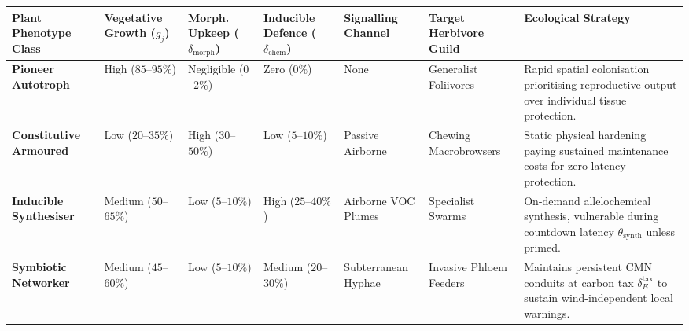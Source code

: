 
\footnotesize
\renewcommand{\arraystretch}{1.15}
\begin{tabularx}{\textwidth}{
  >{\raggedright\arraybackslash\hsize=0.85\hsize}X
  >{\centering\arraybackslash\hsize=0.70\hsize}X
  >{\centering\arraybackslash\hsize=0.68\hsize}X
  >{\centering\arraybackslash\hsize=0.68\hsize}X
  >{\raggedright\arraybackslash\hsize=0.74\hsize}X
  >{\raggedright\arraybackslash\hsize=0.85\hsize}X
  >{\raggedright\arraybackslash\hsize=1.50\hsize}X
}
  \toprule
  \textbf{Plant Phenotype Class} &
  \textbf{Vegetative Growth} ($g_j$) &
  \textbf{Morph. Upkeep} ($\delta_{\text{morph}}$) &
  \textbf{Inducible Defence} ($\delta_{\text{chem}}$) &
  \textbf{Signalling Channel} &
  \textbf{Target Herbivore Guild} &
  \textbf{Ecological Strategy} \\
  \midrule
  \textbf{Pioneer Autotroph} &
  High ($85$--$95\%$) &
  Negligible ($0$--$2\%$) &
  Zero ($0\%$) &
  None &
  Generalist Foliivores &
  Rapid spatial colonisation prioritising reproductive output over individual tissue protection. \\
  \addlinespace[3pt]
  \textbf{Constitutive Armoured} &
  Low ($20$--$35\%$) &
  High ($30$--$50\%$) &
  Low ($5$--$10\%$) &
  Passive Airborne &
  Chewing Macrobrowsers &
  Static physical hardening paying sustained maintenance costs for zero-latency protection. \\
  \addlinespace[3pt]
  \textbf{Inducible Synthesiser} &
  Medium ($50$--$65\%$) &
  Low ($5$--$10\%$) &
  High ($25$--$40\%$) &
  Airborne VOC Plumes &
  Specialist Swarms &
  On-demand allelochemical synthesis, vulnerable during countdown latency $\theta_{\text{synth}}$ unless primed. \\
  \addlinespace[3pt]
  \textbf{Symbiotic Networker} &
  Medium ($45$--$60\%$) &
  Low ($5$--$10\%$) &
  Medium ($20$--$30\%$) &
  Subterranean Hyphae &
  Invasive Phloem Feeders &
  Maintains persistent CMN conduits at carbon tax $\delta_E^{\text{tax}}$ to sustain wind-independent local warnings. \\
  \bottomrule
\end{tabularx}
